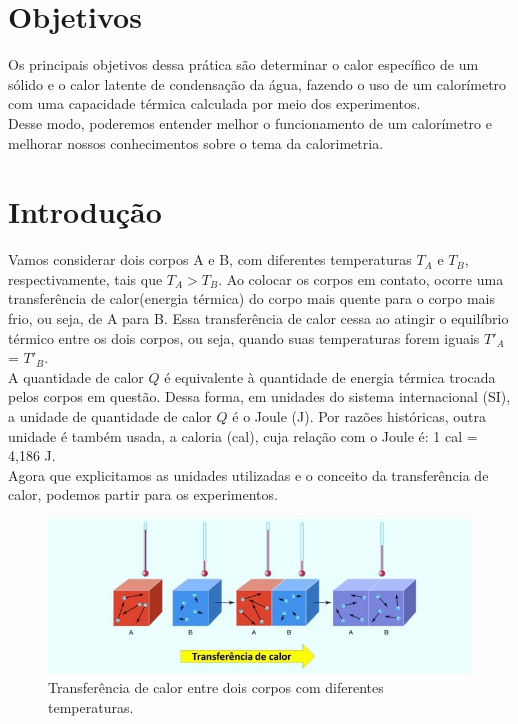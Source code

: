 \newpage


\section{Objetivos}

Os principais objetivos dessa prática são determinar o calor específico de um sólido e o calor latente de condensação da água, fazendo o uso de um calorímetro com uma capacidade térmica calculada por meio dos experimentos.\\

Desse modo, poderemos entender melhor o funcionamento de um calorímetro e melhorar nossos conhecimentos sobre o tema da calorimetria. \\

\section{Introdução}

Vamos considerar dois corpos A e B, com diferentes temperaturas $T_A$ e $T_B$, respectivamente, tais que $T_A > T_B$. Ao colocar os corpos em contato, ocorre uma transferência de calor(energia térmica) do corpo mais quente para o corpo mais frio, ou seja, de A para B. Essa transferência de calor cessa ao atingir o equilíbrio térmico entre os dois
corpos, ou seja, quando suas temperaturas forem iguais $T'_A$ = $T'_B$.\\

A quantidade de calor $Q$ é equivalente à quantidade de energia térmica trocada pelos corpos em questão. Dessa forma, em unidades do sistema internacional (SI), a unidade de quantidade de calor $Q$ é o Joule (J). Por razões históricas, outra unidade é também usada, a caloria (cal), cuja relação com o Joule é: 1 cal = 4,186 J.\\

Agora que explicitamos as unidades utilizadas e o conceito da transferência de calor, podemos partir para os experimentos.\\

\begin{figure}[H]
  \centering
  \includegraphics[scale=0.6]{images/Transferencia de calor.jpg}
  \caption{Transferência de calor entre dois corpos com diferentes temperaturas.}
\end{figure}
